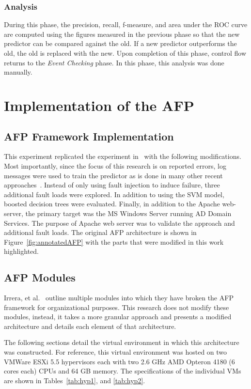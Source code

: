 \subsubsection{Analysis}
During this phase, the precision, recall, f-measure, and area under the
\ac{ROC} curve are computed using the figures measured in the previous phase so
that the new predictor can be compared against the old.  If a new predictor
outperforms the old, the old is replaced with the new.  Upon completion of this
phase, control flow returns to the \emph{Event Checking} phase.  In this phase,
this analysis was done manually.

\section{Implementation of the \ac{AFP}} \label{sec:implementation}
\subsection{\ac{AFP} Framework Implementation}
This experiment replicated the experiment in~\cite{irrera2015} with the
following modifications.  Most importantly, since the focus of this research is
on reported errors, log messages were used to train the predictor as is done in
many other recent
approaches~\cite{domeniconi2002,fulp2008,salfner2007,watanabe2014}.  Instead of
only using fault injection to induce failure, three additional fault loads were
explored.  In addition to using the \ac{SVM} model, boosted decision trees were
evaluated.  Finally, in addition to the Apache web-server, the primary target
was the \ac{MS} Windows Server running \ac{AD} Domain Services.  The purpose of
Apache web server was to validate the approach and additional fault loads.  The
original \ac{AFP} architecture is shown in Figure~\ref{fig:annotatedAFP} with
the parts that were modified in this work highlighted.  

\subsection{\ac{AFP} Modules}
Irrera, et al.~\cite{irrera2015} outline multiple modules into which they have
broken the \ac{AFP} framework for organizational purposes.  This research does
not modify these modules, instead, it takes a more granular approach and
presents a modified architecture and details each element of that architecture.

\figannotatedAFP  

The following sections detail the virtual environment in which this
architecture was constructed.  For reference, this virtual environment was
hosted on two VMWare ESXi 5.5 hypervisors each with two 2.6 \ac{GHz} AMD
Opteron 4180 (6 cores each) \ac{CPU}s and 64 \ac{GB} memory.  The
specifications of the individual \ac{VM}s are shown in Tables~\ref{tab:hyp1},
and \ref{tab:hyp2}.

